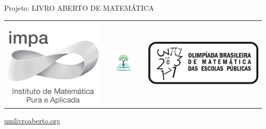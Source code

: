 \documentclass[a4,12pt,openany]{book} %
\begin{document}
\begin{changemargin}{-5cm}{-5cm}
{\fontsize{10}{12}\selectfont
\vspace*{1cm}

\begin{center}
Projeto: LIVRO ABERTO DE MATEMÁTICA

\noindent \begin{tabular}{lcccr}
\includegraphics[scale=.15]{impa}& \quad\quad& \includegraphics[width=3cm]{logo.jpg} & \quad\quad& \includegraphics[scale=.24]{obmep}
\end{tabular}

\url{umlivroaberto.org}
\vspace{.1cm}


\end{center}}
\end{changemargin}
\end{document}
